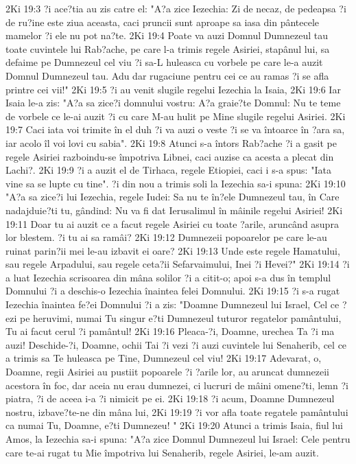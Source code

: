 2Ki 19:3  ?i ace?tia au zis catre el: "A?a zice Iezechia: Zi de necaz, de pedeapsa ?i de ru?ine este ziua aceasta, caci pruncii sunt aproape sa iasa din pântecele mamelor ?i ele nu pot na?te.
2Ki 19:4  Poate va auzi Domnul Dumnezeul tau toate cuvintele lui Rab?ache, pe care l-a trimis regele Asiriei, stapânul lui, sa defaime pe Dumnezeul cel viu ?i sa-L huleasca cu vorbele pe care le-a auzit Domnul Dumnezeul tau. Adu dar rugaciune pentru cei ce au ramas ?i se afla printre cei vii!"
2Ki 19:5  ?i au venit slugile regelui Iezechia la Isaia,
2Ki 19:6  Iar Isaia le-a zis: "A?a sa zice?i domnului vostru: A?a graie?te Domnul: Nu te teme de vorbele ce le-ai auzit ?i cu care M-au hulit pe Mine slugile regelui Asiriei.
2Ki 19:7  Caci iata voi trimite în el duh ?i va auzi o veste ?i se va întoarce în ?ara sa, iar acolo îl voi lovi cu sabia".
2Ki 19:8  Atunci s-a întors Rab?ache ?i a gasit pe regele Asiriei razboindu-se împotriva Libnei, caci auzise ca acesta a plecat din Lachi?.
2Ki 19:9  ?i a auzit el de Tirhaca, regele Etiopiei, caci i s-a spus: "Iata vine sa se lupte cu tine". ?i din nou a trimis soli la Iezechia sa-i spuna:
2Ki 19:10  "A?a sa zice?i lui Iezechia, regele Iudei: Sa nu te în?ele Dumnezeul tau, în Care nadajduie?ti tu, gândind: Nu va fi dat Ierusalimul în mâinile regelui Asiriei!
2Ki 19:11  Doar tu ai auzit ce a facut regele Asiriei cu toate ?arile, aruncând asupra lor blestem. ?i tu ai sa ramâi?
2Ki 19:12  Dumnezeii popoarelor pe care le-au ruinat parin?ii mei le-au izbavit ei oare?
2Ki 19:13  Unde este regele Hamatului, sau regele Arpadului, sau regele ceta?ii Sefarvaimului, Inei ?i Hevei?"
2Ki 19:14  ?i a luat Iezechia scrisoarea din mâna solilor ?i a citit-o; apoi s-a dus în templul Domnului ?i a deschis-o Iezechia înaintea felei Domnului.
2Ki 19:15  ?i s-a rugat Iezechia înaintea fe?ei Domnului ?i a zis: "Doamne Dumnezeul lui Israel, Cel ce ?ezi pe heruvimi, numai Tu singur e?ti Dumnezeul tuturor regatelor pamântului, Tu ai facut cerul ?i pamântul!
2Ki 19:16  Pleaca-?i, Doamne, urechea Ta ?i ma auzi! Deschide-?i, Doamne, ochii Tai ?i vezi ?i auzi cuvintele lui Senaherib, cel ce a trimis sa Te huleasca pe Tine, Dumnezeul cel viu!
2Ki 19:17  Adevarat, o, Doamne, regii Asiriei au pustiit popoarele ?i ?arile lor, au aruncat dumnezeii acestora în foc, dar aceia nu erau dumnezei, ci lucruri de mâini omene?ti, lemn ?i piatra, ?i de aceea i-a ?i nimicit pe ei.
2Ki 19:18  ?i acum, Doamne Dumnezeul nostru, izbave?te-ne din mâna lui,
2Ki 19:19  ?i vor afla toate regatele pamântului ca numai Tu, Doamne, e?ti Dumnezeu! "
2Ki 19:20  Atunci a trimis Isaia, fiul lui Amos, la Iezechia sa-i spuna: "A?a zice Domnul Dumnezeul lui Israel: Cele pentru care te-ai rugat tu Mie împotriva lui Senaherib, regele Asiriei, le-am auzit.
